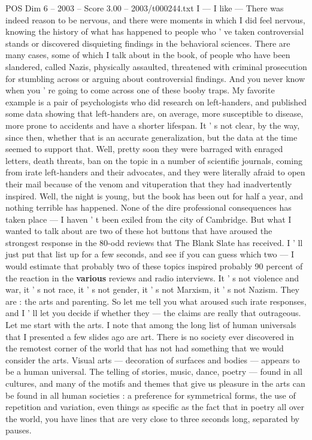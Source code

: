 \begin{textsample}{POS Dim 6 – 2003 – Score 3.00 – 2003/t000244.txt}
I — I like — There was indeed reason to be nervous, and there were moments in which I did feel nervous, knowing the history of what has happened to people who ' ve taken controversial stands or discovered disquieting findings in the behavioral sciences.
There are many cases, some of which I talk about in the book, of people who have been slandered, called Nazis, physically assaulted, threatened with criminal prosecution for stumbling across or arguing about controversial findings.
And you never know when you ' re going to come across one of these booby traps.
My favorite example is a pair of psychologists who did research on left-handers, and published some data showing that left-handers are, on average, more susceptible to disease, more prone to accidents and have a shorter lifespan.
It ' s not clear, by the way, since then, whether that is an accurate generalization, but the data at the time seemed to support that.
Well, pretty soon they were barraged with enraged letters, death threats, ban on the topic in a number of scientific journals, coming from irate left-handers and their advocates, and they were literally afraid to open their mail because of the venom and vituperation that they had inadvertently inspired.
Well, the night is young, but the book has been out for half a year, and nothing terrible has happened.
None of the dire professional consequences has taken place — I haven ' t been exiled from the city of Cambridge.
But what I wanted to talk about are two of these hot buttons that have aroused the strongest response in the 80-odd reviews that The Blank Slate has received.
I ' ll just put that list up for a few seconds, and see if you can guess which two — I would estimate that probably two of these topics inspired probably 90 percent of the reaction in the \textbf{various} reviews and radio interviews.
It ' s not violence and war, it ' s not race, it ' s not gender, it ' s not Marxism, it ' s not Nazism.
They are : the arts and parenting.
So let me tell you what aroused such irate responses, and I ' ll let you decide if whether they — the claims are really that outrageous.
Let me start with the arts.
I note that among the long list of human universals that I presented a few slides ago are art.
There is no society ever discovered in the remotest corner of the world that has not had something that we would consider the arts.
Visual arts — decoration of surfaces and bodies — appears to be a human universal.
The telling of stories, music, dance, poetry — found in all cultures, and many of the motifs and themes that give us pleasure in the arts can be found in all human societies : a preference for symmetrical forms, the use of repetition and variation, even things as specific as the fact that in poetry all over the world, you have lines that are very close to three seconds long, separated by pauses.

\end{textsample}
